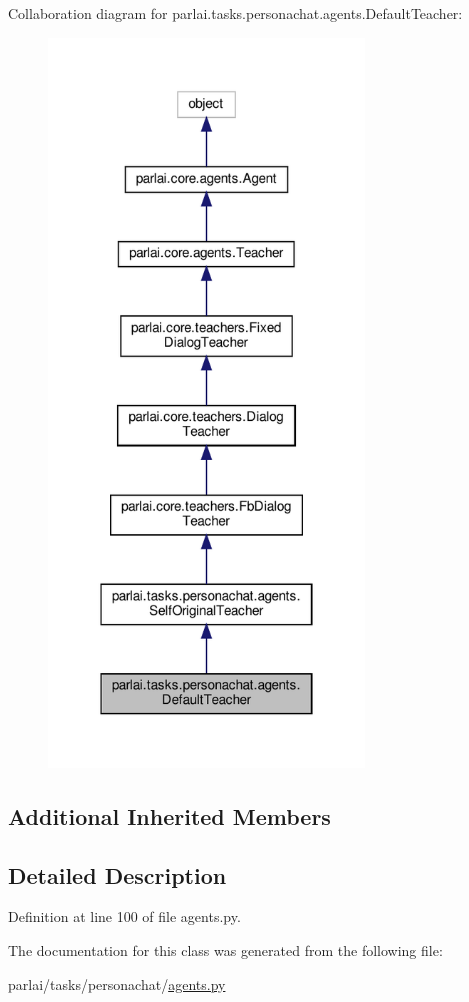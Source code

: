 Collaboration diagram for parlai.\+tasks.\+personachat.\+agents.\+Default\+Teacher\+:\nopagebreak
\begin{figure}[H]
\begin{center}
\leavevmode
\includegraphics[width=238pt]{d4/db1/classparlai_1_1tasks_1_1personachat_1_1agents_1_1DefaultTeacher__coll__graph}
\end{center}
\end{figure}
\subsection*{Additional Inherited Members}


\subsection{Detailed Description}


Definition at line 100 of file agents.\+py.



The documentation for this class was generated from the following file\+:\begin{DoxyCompactItemize}
\item 
parlai/tasks/personachat/\hyperlink{parlai_2tasks_2personachat_2agents_8py}{agents.\+py}\end{DoxyCompactItemize}
